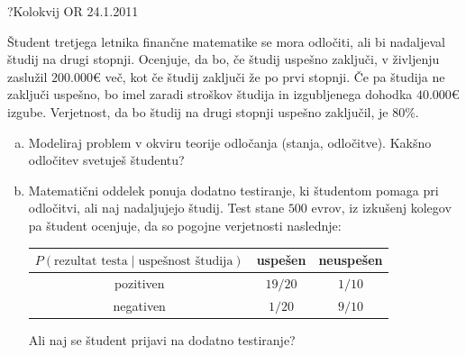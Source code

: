 \begin{naloga}{?}{Kolokvij OR 24.1.2011}
\begin{vprasanje}
Študent tretjega letnika finančne matematike se mora odločiti,
ali bi nadaljeval študij na drugi stopnji.
Ocenjuje, da bo, če študij uspešno zaključi,
v življenju zaslužil $200.000 €$ več,
kot če študij zaključi že po prvi stopnji.
Če pa študija ne zaključi uspešno,
bo imel zaradi stroškov študija in izgubljenega dohodka $40.000 €$ izgube.
Verjetnost, da bo študij na drugi stopnji uspešno zaključil, je $80 \%$.
\begin{enumerate}[(a)]
\item Modeliraj problem v okviru teorije odločanja (stanja, odločitve).
Kakšno odločitev svetuješ študentu?

\item Matematični oddelek ponuja dodatno testiranje,
ki študentom pomaga pri odločitvi, ali naj nadaljujejo študij.
Test stane $500$ evrov,
iz izkušenj kolegov pa študent ocenjuje,
da so pogojne verjetnosti naslednje:
\begin{center}
\begin{tabular}{c|cc}
$P(\text{rezultat testa} \;|\; \text{uspešnost študija})$
& uspešen & neuspešen \\ \hline
pozitiven & $19/20$ & $1/10$ \\
negativen & $1/20$ & $9/10$
\end{tabular}
\end{center}
Ali naj se študent prijavi na dodatno testiranje?
\end{enumerate}
\end{vprasanje}
\begin{odgovor}
\end{odgovor}
\end{naloga}


